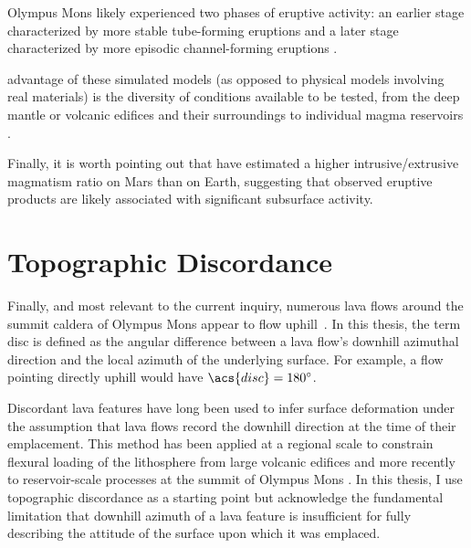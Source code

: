 Olympus Mons likely experienced two phases of eruptive activity: an earlier stage characterized by more stable tube-forming eruptions and a later stage characterized by more episodic channel-forming eruptions \parencite{bleacher_olympus_2007,peters_flank_2017}. 

advantage of these simulated models (as opposed to physical models involving real materials) is the diversity of conditions available to be tested, from the deep mantle \parencite[e.g.,][]{redmond_numerical_2004,ogawa_four-stage_2021} or volcanic edifices and their surroundings \parencite[e.g.,][]{isherwood_volcanic_2013} to individual magma reservoirs \parencite[e.g.,][]{grosfils_magma_2007,grosfils_elastic_2015}.

Finally, it is worth pointing out that \textcite[][and others]{black_eruptibility_2016} have estimated a higher intrusive/extrusive magmatism ratio on Mars than on Earth, suggesting that observed eruptive products are likely associated with significant subsurface activity.

\section{Topographic Discordance}\label{sec:discordance}

Finally, and most relevant to the current inquiry, numerous lava flows around the summit caldera of Olympus Mons appear to flow uphill~\parencite[Figure~\ref{fig:uphill-flows}; after][]{mouginis-mark_late-stage_2019}. In this thesis, the term \ac{disc} is defined as the angular difference between a lava flow's downhill azimuthal direction and the local azimuth of the underlying surface. For example, a flow pointing directly uphill would have $\acs{disc}=\ang{180}$. 

Discordant lava features have long been used to infer surface deformation under the assumption that lava flows record the downhill direction at the time of their emplacement. This method has been applied at a regional scale to constrain flexural loading of the lithosphere from large volcanic edifices \parencite{mouginis-mark_ancient_1982,isherwood_volcanic_2013,chadwick_late_2015} and more recently to reservoir-scale processes at the summit of Olympus Mons \parencite{mouginis-mark_late-stage_2019}. In this thesis, I use topographic discordance as a starting point but acknowledge the fundamental limitation that downhill azimuth of a lava feature is insufficient for fully describing the attitude of the surface upon which it was emplaced.

